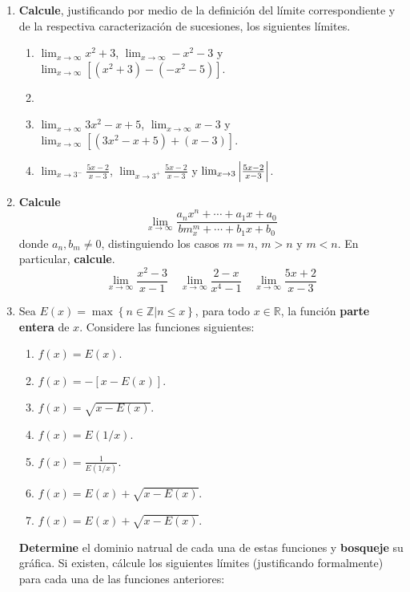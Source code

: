 \documentclass[12pt]{article}
\begin{document}
\begin{enumerate}
    \item \textbf{Calcule}, justificando por medio de la definición del límite correspondiente y de la respectiva caracterización de sucesiones, los siguientes límites.
    \begin{enumerate}
        \item $\lim_{x\rightarrow\infty}x^2+3$, $\lim_{x\rightarrow\infty}-x^2-3$ y $\lim_{x\rightarrow\infty}[(x^2+3)-(-x^2-5)]$.
        \item \item $\lim_{x\rightarrow\infty}3x^2-x+5$, $\lim_{x\rightarrow\infty}x-3$ y $\lim_{x\rightarrow\infty}[(3x^2-x+5)+(x-3)]$.
        \item $\lim_{x\rightarrow3^-}\frac{5x-2}{x-3}$, $\lim_{x\rightarrow3^+}\frac{5x-2}{x-3}$ y $\lim_{x\rightarrow3}\left| \frac{5x-2}{x-3} \right|$.
    \end{enumerate}
    \item \textbf{Calcule}
    \begin{equation*}
        \lim_{ x\rightarrow\infty}\frac{a_nx^n+\cdots+a_1x+a_0}{bm_x^m+\cdots+b_1x+b_0}
    \end{equation*}
    donde $a_n,b_m\neq0$, distinguiendo los casos $m=n$, $m>n$ y $m<n$. En particular, \textbf{calcule}.
    \begin{equation*}
        \lim_{ x\rightarrow\infty}\frac{x^2-3}{x-1}\quad\lim_{ x\rightarrow\infty}\frac{2-x}{x^4-1}\quad\lim_{ x\rightarrow\infty}\frac{5x+2}{x-3}
    \end{equation*}
    \item Sea $E(x)=\max\left\{n\in\mathbb{Z}\Big|n\leq x \right\}$, para todo $x\in\mathbb{R}$, la función \textbf{parte entera} de $x$. Considere las funciones siguientes:
    \begin{enumerate}
        \item $f(x)=E(x)$.
        \item $f(x)=-[x-E(x)]$.
        \item $f(x)=\sqrt{x-E(x)}$.
        \item $f(x)=E(1/x)$.
        \item $f(x)=\frac{1}{E(1/x)}$.
        \item $f(x)=E(x)+\sqrt{x-E(x)}$.
        \item $f(x)=E(x)+\sqrt{x-E(x)}$.
    \end{enumerate}
    \textbf{Determine} el dominio natrual de cada una de estas funciones y \textbf{bosqueje} su gráfica. Si existen, cálcule los siguientes límites (justificando formalmente) para cada una de las funciones anteriores:

\end{enumerate}
\end{document}
